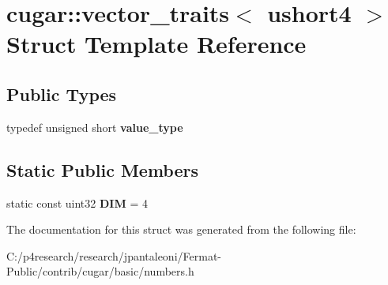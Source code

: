 \hypertarget{structcugar_1_1vector__traits_3_01ushort4_01_4}{}\section{cugar\+:\+:vector\+\_\+traits$<$ ushort4 $>$ Struct Template Reference}
\label{structcugar_1_1vector__traits_3_01ushort4_01_4}
\subsection*{Public Types}
\begin{DoxyCompactItemize}
\item 
\mbox{\label{structcugar_1_1vector__traits_3_01ushort4_01_4_afbe308c81586962f59a350750de04abc}} 
typedef unsigned short {\bfseries value\+\_\+type}
\end{DoxyCompactItemize}
\subsection*{Static Public Members}
\begin{DoxyCompactItemize}
\item 
\mbox{\label{structcugar_1_1vector__traits_3_01ushort4_01_4_a86179d203cc001afb0accb096e68482c}} 
static const uint32 {\bfseries D\+IM} = 4
\end{DoxyCompactItemize}


The documentation for this struct was generated from the following file\+:\begin{DoxyCompactItemize}
\item 
C\+:/p4research/research/jpantaleoni/\+Fermat-\/\+Public/contrib/cugar/basic/numbers.\+h\end{DoxyCompactItemize}
